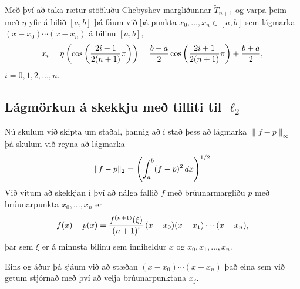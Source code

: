 \documentclass[A4paper,10pt,icelandic]{sphinxmanual}
\begin{document}
Með því að taka rætur stöðluðu Chebyshev margliðunnar
\(\tilde T_{n+1}\) og varpa þeim með \(\eta\) yfir á bilið
\([a,b]\) þá fáum við þá punkta \(x_0,\ldots,x_n \in [a,b]\) sem
lágmarka \((x-x_0)\cdots (x-x_n)\) á bilinu \([a,b]\),
\begin{gather}
\begin{split}x_i = \eta\left(\cos\left(\frac{2i+1}{2(n+1)}\pi\right)\right)
    = \frac{b-a}2 \cos\left(\frac{2i+1}{2(n+1)}\pi\right) + \frac{b+a}2,\end{split}\notag
\end{gather}
\(i=0,1,2,\ldots,n\).


\subsection{Lágmörkun á skekkju með tilliti til \(\ell_2\)}
\label{kafli03:lagmorkun-a-skekkju-me-tilliti-til}
Nú skulum við skipta um staðal, þannig að í stað þess að lágmarka
\(\|f-p\|_\infty\) þá skulum við reyna að lágmarka
\begin{gather}
\begin{split}\|f-p\|_2 = \left(\int_a^b (f-p)^2\, dx\right)^{1/2}\end{split}\notag
\end{gather}
Við vitum að skekkjan í því að nálga fallið \(f\) með
brúunarmargliðu \(p\) með brúunarpunkta \(x_0,\ldots,x_n\) er
\begin{gather}
\begin{split}f(x)-p(x) = \frac{f^{(n+1)}(\xi)}{(n+1)!}\, (x-x_0)(x-x_1)\cdots (x-x_n),\end{split}\notag
\end{gather}
þar sem \(\xi\) er á minnsta bilinu sem inniheldur \(x\) og
\(x_0,x_1,\ldots,x_n\).

Eins og áður þá sjáum við að stæðan \((x-x_0)\cdots(x-x_n)\) það
eina sem við getum stjórnað með því að velja brúunarpunktana
\(x_j\).

\end{document}
